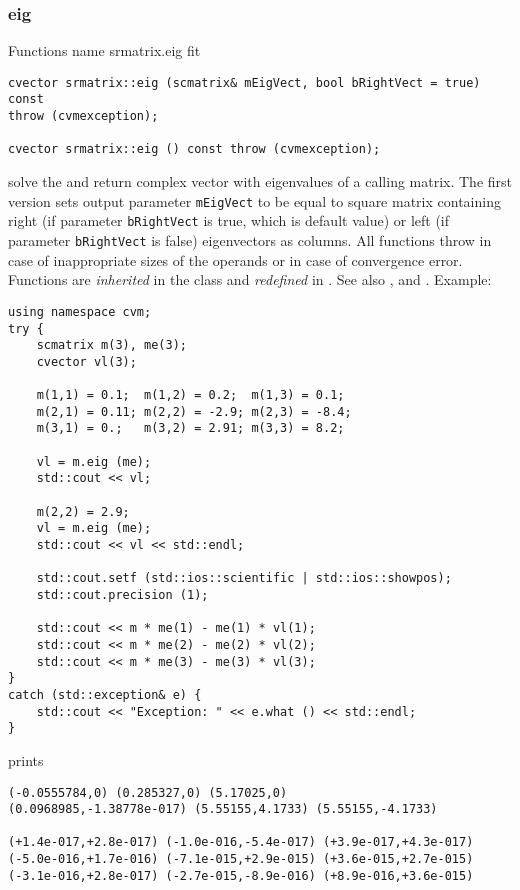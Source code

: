 \subsubsection{eig}
Functions%
\pdfdest name {srmatrix.eig} fit
\begin{verbatim}
cvector srmatrix::eig (scmatrix& mEigVect, bool bRightVect = true) const
throw (cvmexception);

cvector srmatrix::eig () const throw (cvmexception);
\end{verbatim}
solve the
and return  complex vector with eigenvalues
of a calling matrix.
The first version
sets  output parameter \verb"mEigVect" to be equal
to  square matrix containing right (if parameter
\verb"bRightVect" is true, which is default value)
or left (if parameter
\verb"bRightVect" is false)
eigenvectors as columns.
All  functions
throw 
in case of inappropriate sizes of the operands
or in case of convergence error.
Functions are \emph{inherited} in the class
and \emph{redefined} in .
See also
,
 and
.
Example:
\begin{Verbatim}
using namespace cvm;
try {
    scmatrix m(3), me(3);
    cvector vl(3);

    m(1,1) = 0.1;  m(1,2) = 0.2;  m(1,3) = 0.1;
    m(2,1) = 0.11; m(2,2) = -2.9; m(2,3) = -8.4;
    m(3,1) = 0.;   m(3,2) = 2.91; m(3,3) = 8.2;

    vl = m.eig (me);
    std::cout << vl;

    m(2,2) = 2.9;
    vl = m.eig (me);
    std::cout << vl << std::endl;

    std::cout.setf (std::ios::scientific | std::ios::showpos);
    std::cout.precision (1);

    std::cout << m * me(1) - me(1) * vl(1);
    std::cout << m * me(2) - me(2) * vl(2);
    std::cout << m * me(3) - me(3) * vl(3);
}
catch (std::exception& e) {
    std::cout << "Exception: " << e.what () << std::endl;
}
\end{Verbatim}
prints
\begin{Verbatim}
(-0.0555784,0) (0.285327,0) (5.17025,0)
(0.0968985,-1.38778e-017) (5.55155,4.1733) (5.55155,-4.1733)

(+1.4e-017,+2.8e-017) (-1.0e-016,-5.4e-017) (+3.9e-017,+4.3e-017)
(-5.0e-016,+1.7e-016) (-7.1e-015,+2.9e-015) (+3.6e-015,+2.7e-015)
(-3.1e-016,+2.8e-017) (-2.7e-015,-8.9e-016) (+8.9e-016,+3.6e-015)
\end{Verbatim}
\newpage



